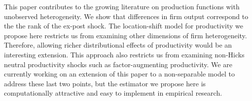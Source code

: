 \documentclass[12pt]{article}
\begin{document}
This paper contributes to the growing literature on production functions with unobserved heterogeneity. We show that differences in firm output correspond to the the rank of the ex-post shock. The location-shift model for productivity we propose here restricts us from examining other dimensions of firm heterogeneity. Therefore, allowing richer distributional effects of productivity would be an interesting extension. This approach also restricts us from examining non-Hicks neutral productivity shocks such as factor-augmenting productivity. We are currently working on an extension of this paper to a non-separable model to address these last two points, but the estimator we propose here is computationally attractive and easy to implement in empirical research.    

\pagebreak
\newpage









{}

\pagebreak
\newpage
\end{document}
